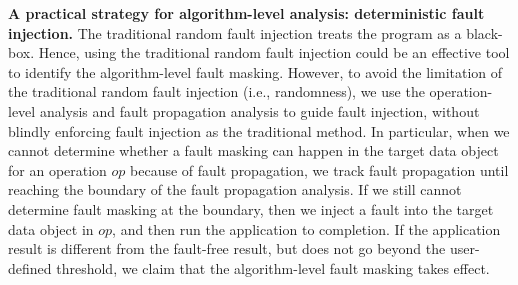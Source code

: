 \textbf{A practical strategy for algorithm-level analysis: deterministic fault injection.}
The traditional random fault injection treats the program as a black-box. 
Hence, using the traditional random fault injection could be an effective tool to identify the algorithm-level fault masking.
However, to avoid the limitation of the traditional random fault injection (i.e., randomness), %
we use the operation-level analysis and fault propagation analysis to guide fault injection, 
without blindly enforcing fault injection as the traditional method.
In particular, when we cannot determine whether a fault masking can happen in the target data object for an operation $op$ because of fault propagation,  we track fault propagation until 
reaching the boundary of the fault propagation analysis.
If we still cannot determine fault masking at the boundary, then  
we inject a fault into the target data object in $op$, %
and then run the application to completion. 
If the application result is different from the fault-free result, %
but does not go beyond the user-defined threshold, we claim that the algorithm-level fault masking takes effect. %

\begin{comment}
As described above, our fault injection has a deterministic plan on when and where to inject faults. Also, the operation-level and fault propagation analysis is complementary to our fault injection. Hence we avoid fault injection if possible.c
\end{comment}

